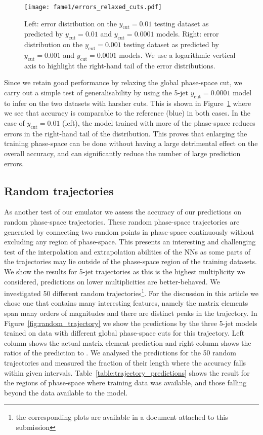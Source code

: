 \documentclass[main.tex]{subfiles}
\begin{document}
\begin{figure}
    \centering
    \texttt{[image: fame1/errors\_relaxed\_cuts.pdf]}
    \caption{Left: error distribution on the $y_{\mathrm{cut}} = 0.01$ testing dataset as predicted by $y_{\mathrm{cut}} = 0.01$ and $y_{\mathrm{cut}} = 0.0001$ models.
    Right: error distribution on the $y_{\mathrm{cut}} = 0.001$ testing dataset as predicted by $y_{\mathrm{cut}} = 0.001$ and $y_{\mathrm{cut}} = 0.0001$ models.
    We use a logarithmic vertical axis to highlight the right-hand tail of the error distributions.}
    \label{fig:errors_relaxed_cuts}
\end{figure}
Since we retain good performance by relaxing the global phase-space cut, 
we carry out a simple test of generalisability by using the 5-jet $y_{\mathrm{cut}} = 0.0001$ model to infer on the two datasets with harsher cuts.
This is shown in Figure~\ref{fig:errors_relaxed_cuts} where we see that accuracy is comparable to the reference (blue) in both cases.
In the case of $y_{\mathrm{cut}} = 0.01$ (left), the model trained with more of the phase-space reduces errors in the right-hand tail of the distribution. 
This proves that enlarging the training phase-space can be done without having a large detrimental effect on the overall accuracy, and can significantly reduce the number of
large prediction errors. 


\subsection{Random trajectories}\label{sec:trajectories}
As another test of our emulator we assess the accuracy of our predictions on random phase-space trajectories.
These random phase-space trajectories are generated by connecting two random points in phase-space continuously without excluding any region of phase-space.
This presents an interesting and challenging test of the interpolation and extrapolation abilities of the NNs as some parts of the trajectories may lie outside of the phase-space region of the training datasets.
We show the results for 5-jet trajectories as this is the highest multiplicity we considered, predictions on lower multiplicities are better-behaved.
We investigated 50 different random trajectories\footnote{the corresponding plots are available in a document attached to this submission}. For the discussion in this article 
we chose one that contains many interesting features, namely the matrix elements span many orders of magnitudes and there are distinct peaks in the trajectory.
In Figure~\ref{fig:random_trajectory} we show the predictions by the three 5-jet models trained on data with different global phase-space cuts for this trajectory.
Left column shows the actual matrix element prediction and right column shows the ratios of the prediction to {\NJet}.
We analysed the predictions for the 50 random trajectories and measured the fraction of their length where the accuracy falls within given intervals.
Table~\ref{table:trajectory_predictions} shows the result for the regions of phase-space where training data was available, and those falling beyond the data available to the model. 
\end{document}
